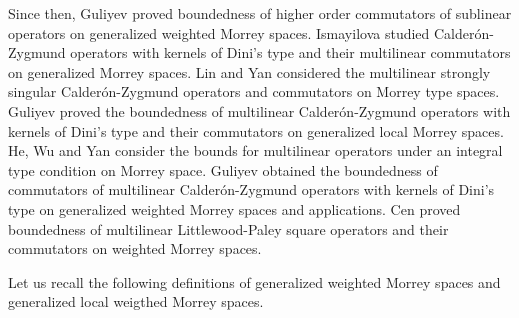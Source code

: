 \documentclass[11pt, twoside, leqno]{article}
\begin{document}
Since then, Guliyev \cite{Gu1} proved boundedness of higher order commutators of sublinear operators on generalized weighted Morrey spaces. Ismayilova \cite{Ismayilova} studied Calder\'{o}n-Zygmund operators with kernels of Dini's type and their multilinear commutators on generalized Morrey spaces. Lin and Yan \cite{Lin-Yan} considered the multilinear strongly singular Calder\'{o}n-Zygmund operators and commutators on Morrey type spaces. Guliyev \cite{Gu3} proved the boundedness of multilinear Calder\'{o}n-Zygmund operators with kernels of Dini's type and their commutators on generalized local Morrey spaces. He, Wu and Yan \cite{He} consider the bounds for multilinear operators under an integral type condition on Morrey space. Guliyev \cite{Gu2} obtained the boundedness of commutators of multilinear Calder\'{o}n-Zygmund operators with kernels of Dini's type on generalized weighted Morrey spaces and applications. Cen \cite{cen1} proved boundedness of multilinear Littlewood-Paley square operators and their commutators on weighted Morrey spaces.

Let us recall the following definitions of generalized weighted Morrey spaces and generalized local weigthed Morrey spaces. 
\end{document}
